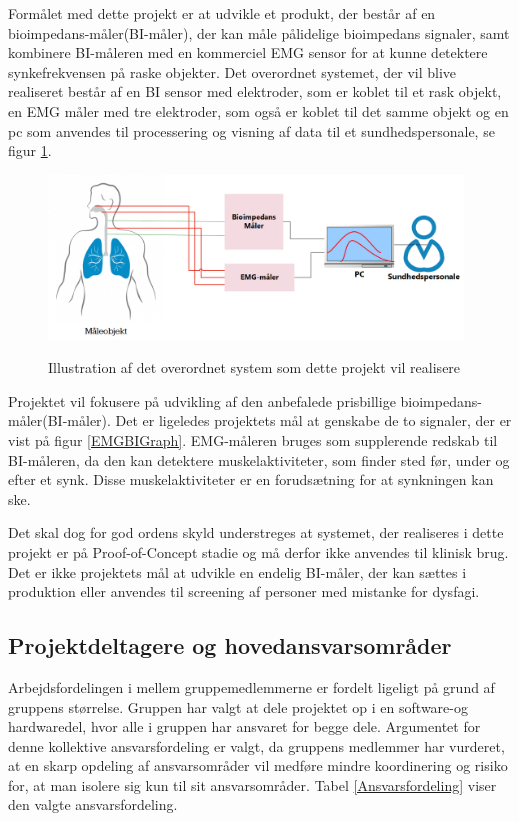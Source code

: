 Formålet med dette projekt er at udvikle et produkt, der består af en bioimpedans-måler(BI-måler), der kan måle pålidelige bioimpedans signaler, samt kombinere BI-måleren med en kommerciel EMG sensor for at kunne detektere synkefrekvensen på raske objekter. Det overordnet systemet, der vil blive realiseret består af en BI sensor med elektroder, som er koblet til et rask objekt, en EMG måler med tre elektroder, som også er koblet til det samme objekt og en pc som anvendes til processering og visning af data til et sundhedspersonale, se figur \ref{KonceptuelDiagram}.  

\begin{figure}[H]
\centering
{\includegraphics[width=11cm]
{Figure/KonceptuelDiagram}}
\caption{Illustration af  det overordnet system som dette projekt vil realisere}
\label{KonceptuelDiagram}
\end{figure}

Projektet vil fokusere på udvikling af den anbefalede prisbillige bioimpedans-måler(BI-måler). Det er ligeledes projektets mål at genskabe de to signaler, der er vist på figur \ref{EMGBIGraph}. EMG-måleren bruges som supplerende redskab til BI-måleren, da den kan detektere muskelaktiviteter, som finder sted før, under og efter et synk. Disse muskelaktiviteter er en forudsætning for at synkningen kan ske. 

Det skal dog for god ordens skyld understreges at systemet, der realiseres i dette projekt er på Proof-of-Concept stadie og må derfor ikke anvendes til klinisk brug. Det er ikke projektets mål at udvikle en endelig BI-måler, der kan sættes i produktion eller anvendes til screening af personer med mistanke for dysfagi. 

\subsection{Projektdeltagere og hovedansvarsområder} 
Arbejdsfordelingen i mellem gruppemedlemmerne er fordelt ligeligt på grund af gruppens størrelse. Gruppen har valgt at dele projektet op i en software-og hardwaredel, hvor alle i gruppen har ansvaret for  begge dele. Argumentet for denne kollektive ansvarsfordeling er valgt, da gruppens medlemmer har vurderet, at en skarp opdeling af ansvarsområder vil medføre mindre koordinering og risiko for, at man isolere sig kun til sit ansvarsområder. Tabel \ref{Ansvarsfordeling} viser den valgte ansvarsfordeling. 

